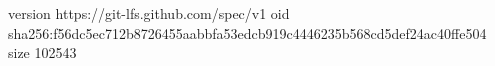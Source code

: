 version https://git-lfs.github.com/spec/v1
oid sha256:f56dc5ec712b8726455aabbfa53edcb919c4446235b568cd5def24ac40ffe504
size 102543
